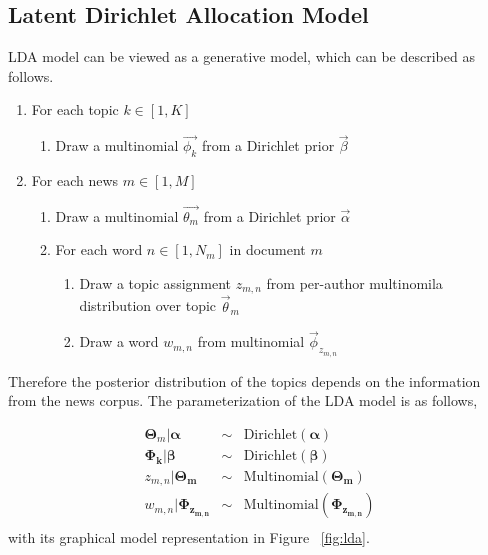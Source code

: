 \subsection{Latent Dirichlet Allocation Model}\label{4lda}

LDA model can be viewed as a generative model, which can be described as follows.
\begin{enumerate}
   \item For each topic $k \in [1,K]$
   \begin{enumerate}
     \item Draw a multinomial $\vec{\phi_k}$ from a Dirichlet prior $\vec{\beta}$
    \end{enumerate}
    \item For each news $m \in [1,M]$
     \begin{enumerate}
     \item Draw a multinomial $\vec{\theta_m}$ from a Dirichlet prior $\vec{\alpha}$
     
     \item For each word $n \in [1,N_m]$ in document $m$
     \begin{enumerate}
            \item Draw a topic assignment $z_{m,n}$ from per-author multinomila distribution over topic $\vec{\theta}_{m}$ %
            \item Draw a word $w_{m,n}$ from multinomial $\vec{\phi}_{z_{m, n}}$
    \end{enumerate}
    \end{enumerate}
        
\end{enumerate}

Therefore the posterior distribution of the topics depends on the information from the news corpus. The parameterization of the LDA model is as follows,

\begin{eqnarray*} \label{eq:lda}
\boldsymbol{\Theta}_m | \boldsymbol{\alpha} & \sim & \text{Dirichlet}(\boldsymbol{\alpha})\\
\boldsymbol{\Phi_{k}} | \boldsymbol{\beta} & \sim & \text{Dirichlet}(\boldsymbol{\beta})\\
z_{m,n} | \boldsymbol{\Theta_{m}} & \sim & \text{Multinomial}(\boldsymbol{\Theta_{m}})\\
w_{m,n} | \boldsymbol{\Phi_{z_{m,n}}} & \sim & \text{Multinomial}(\boldsymbol{\Phi_{z_{m,n}}})\\

\end{eqnarray*}
with its graphical model representation in Figure ~\ref{fig:lda}.

